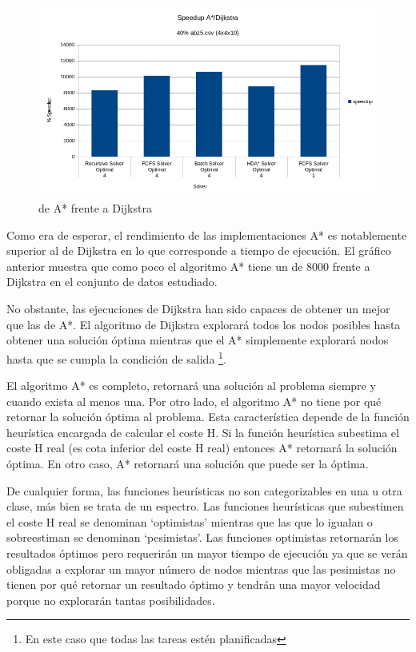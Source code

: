 \begin{figure}[h]
    \centering
    \includegraphics[width=\linewidth]{Media/Ch2/Speedup_Dijkstra.png}
    \caption{ de A* frente a Dijkstra}
    \label{fig:Speedup_Dijkstra}
\end{figure}

Como era de esperar, el rendimiento de las implementaciones A*
es notablemente superior al de Dijkstra en lo que corresponde
a tiempo de ejecución.
El gráfico anterior muestra que como poco el algoritmo A*
tiene un  de 8000 frente a Dijkstra
en el conjunto de datos estudiado.

No obstante, las ejecuciones de Dijkstra han sido capaces
de obtener un  mejor que las de A*.
El algoritmo de Dijkstra explorará todos los
nodos posibles hasta obtener una solución óptima
mientras que el A* simplemente explorará nodos
hasta que se cumpla la condición de salida
\footnote{En este caso que todas las tareas estén planificadas}.

El algoritmo A* es completo, retornará una solución al problema
siempre y cuando exista al menos una.
Por otro lado, el algoritmo A* no tiene por qué retornar la
solución óptima al problema.
Esta característica depende de la función heurística
encargada de calcular el coste H.
Si la función heurística subestima el coste H real
(es cota inferior del coste H real)
entonces A* retornará la solución óptima.
En otro caso, A* retornará una solución que puede
ser la óptima.

De cualquier forma, las funciones heurísticas no son
categorizables en una u otra clase,
más bien se trata de un espectro.
Las funciones heurísticas que subestimen
el coste H real se denominan `optimistas'
mientras que las que lo igualan o sobreestiman
se denominan `pesimistas'.
Las funciones optimistas retornarán los resultados óptimos
pero requerirán un mayor tiempo de ejecución ya que
se verán obligadas a explorar un mayor número de nodos
mientras que las pesimistas no tienen por qué retornar un
resultado óptimo y tendrán una mayor velocidad porque
no explorarán tantas posibilidades.

